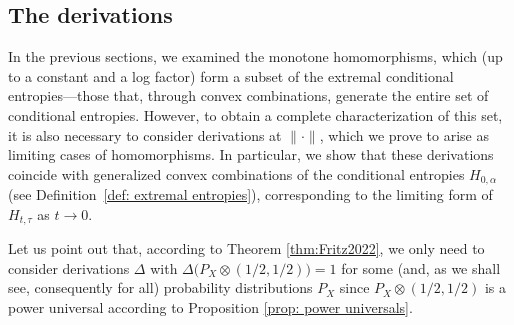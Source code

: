 \documentclass[aps,pra,11pt,onecolumn,nofootinbib,tightenlines]{revtex4-2}
\theoremstyle{definition}
\begin{document}
\subsection{The derivations}
\label{sec: derivations}
In the previous sections, we examined the monotone homomorphisms, which (up to a constant and a log factor) form a subset of the extremal conditional entropies—those that, through convex combinations, generate the entire set of conditional entropies. However, to obtain a complete characterization of this set, it is also necessary to consider derivations at $\|\cdot\|$, which we prove to arise as limiting cases of homomorphisms. In particular, we show that these derivations coincide with generalized convex combinations of the conditional entropies \(H_{0,\alpha}\) (see Definition~\ref{def: extremal entropies}), corresponding to the limiting form of \(H_{t,\tau}\) as \(t \to 0\).

Let us point out that, according to Theorem \ref{thm:Fritz2022}, we only need to consider derivations $\Delta$ with $\Delta\big(P_X\otimes(1/2,1/2)\big)=1$ for some (and, as we shall see, consequently for all) probability distributions $P_X$ since $P_X\otimes(1/2,1/2)$ is a power universal according to Proposition \ref{prop: power universals}.
\end{document}
